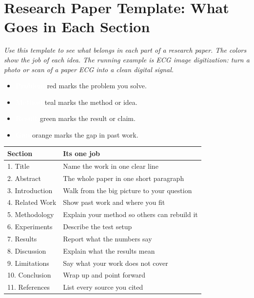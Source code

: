 \documentclass[11pt]{article}
\begin{document}
\section*{Research Paper Template: What Goes in Each Section}

\textit{Use this template to see what belongs in each part of a research paper. The colors show the job of each idea. The running example is ECG image digitization: turn a photo or scan of a paper ECG into a clean digital signal.}


\begin{itemize}
\item \colorbox{cProblem}{\textcolor{white}{\textbf{ Problem }}} \textcolor{cProblem}{red} marks the problem you solve.
\item \colorbox{cMethod}{\textcolor{white}{\textbf{ Method }}} \textcolor{cMethod}{teal} marks the method or idea.
\item \colorbox{cResult}{\textcolor{white}{\textbf{ Result }}} \textcolor{cResult}{green} marks the result or claim.
\item \colorbox{cGap}{\textcolor{white}{\textbf{ Gap }}} \textcolor{cGap}{orange} marks the gap in past work.
\end{itemize}


\begin{tabular}{ll}
\toprule
\textbf{Section} & \textbf{Its one job} \\
\midrule
1. Title & Name the work in one clear line \\
2. Abstract & The whole paper in one short paragraph \\
3. Introduction & Walk from the big picture to your question \\
4. Related Work & Show past work and where you fit \\
5. Methodology & Explain your method so others can rebuild it \\
6. Experiments & Describe the test setup \\
7. Results & Report what the numbers say \\
8. Discussion & Explain what the results mean \\
9. Limitations & Say what your work does not cover \\
10. Conclusion & Wrap up and point forward \\
11. References & List every source you cited \\
\bottomrule
\end{tabular}
\end{document}
